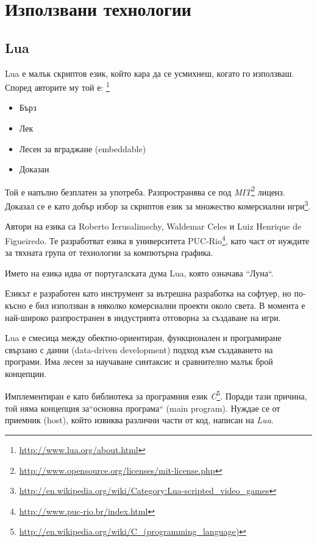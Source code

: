 \section{Използвани технологии}

	\subsection{Lua}
	
		Lua е малък скриптов език, който кара да се усмихнеш, когато го използваш. 
		Според авторите му той е: \footnote{\url{http://www.lua.org/about.html}} 
		
		\begin{itemize}			
			\item Бърз				
			\item Лек				
			\item Лесен за вграджане (embeddable)				
			\item Доказан				
		\end{itemize}
		
		Той е напълно безплатен за употреба. Разпространява се под 
		\emph{MIT}\footnote{\url{http://www.opensource.org/licenses/mit-license.php}} лиценз. 
		Доказал се е като добър избор за скриптов език за множество комерсиални 
		игри\footnote{\url{http://en.wikipedia.org/wiki/Category:Lua-scripted_video_games}}.
		
		Автори на езика са Roberto Ierusalimschy, Waldemar Celes и Luiz Henrique de Figueiredo. Те разработват езика в
		университета PUC-Rio\footnote{\url{http://www.puc-rio.br/index.html}}, като част от нуждите за тяхната група
		от технологии за компютърна графика. 
		
		Името на езика идва от португалската дума Lua, която означава ``Луна``.
		
		Езикът е разработен като инструмент за вътрешна разработка на софтуер, но по-късно е бил
		използван в няколко комерсиални проекти около света. В момента е най-широко разпространен в
		индустрията отговорна за създаване на игри. \cite{Ierusalimschy}
		
		Lua е смесица между обектно-ориентиран, функционален и програмиране свързано с данни (data-driven development)
		подход към създаването на програми. Има лесен за научаване синтаксис и сравнително малък брой концепции. 				
		
		Имплементиран е като библиотека за програмния език \emph{C}\footnote{\url{http://en.wikipedia.org/wiki/C_(programming_language)}}. 
		Поради тази причина, той няма концепция за``основна програма`` (main program). Нуждае се от приемник (host), който извиква различни
		части от код, написан на \emph{Lua}.
		
